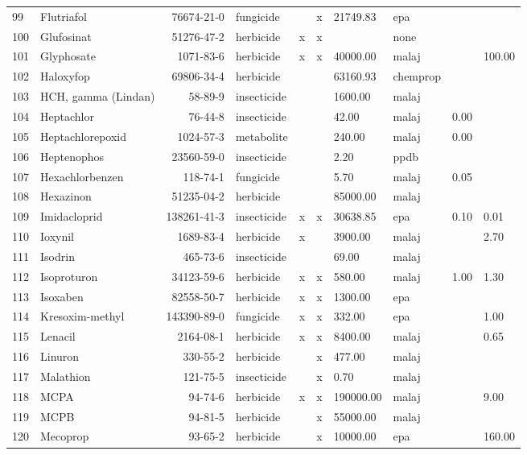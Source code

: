 \begin{longtable}{lp{3cm}rlp{0.5cm}p{0.5cm}p{1.5cm}p{1cm}p{1cm}p{1cm}}
  99 & Flutriafol & 76674-21-0 & fungicide &  & x & 21749.83 & epa &  &  \\ 
  100 & Glufosinat & 51276-47-2 & herbicide & x & x &  & none &  &  \\ 
  101 & Glyphosate & 1071-83-6 & herbicide & x & x & 40000.00 & malaj &  & 100.00 \\ 
  102 & Haloxyfop & 69806-34-4 & herbicide &  &  & 63160.93 & chemprop &  &  \\ 
  103 & HCH, gamma (Lindan) & 58-89-9 & insecticide &  &  & 1600.00 & malaj &  &  \\ 
  104 & Heptachlor & 76-44-8 & insecticide &  &  & 42.00 & malaj & 0.00 &  \\ 
  105 & Heptachlorepoxid & 1024-57-3 & metabolite &  &  & 240.00 & malaj & 0.00 &  \\ 
  106 & Heptenophos & 23560-59-0 & insecticide &  &  & 2.20 & ppdb &  &  \\ 
  107 & Hexachlorbenzen & 118-74-1 & fungicide &  &  & 5.70 & malaj & 0.05 &  \\ 
  108 & Hexazinon & 51235-04-2 & herbicide &  &  & 85000.00 & malaj &  &  \\ 
  109 & Imidacloprid & 138261-41-3 & insecticide & x & x & 30638.85 & epa & 0.10 & 0.01 \\ 
  110 & Ioxynil & 1689-83-4 & herbicide & x &  & 3900.00 & malaj &  & 2.70 \\ 
  111 & Isodrin & 465-73-6 & insecticide &  &  & 69.00 & malaj &  &  \\ 
  112 & Isoproturon & 34123-59-6 & herbicide & x & x & 580.00 & malaj & 1.00 & 1.30 \\ 
  113 & Isoxaben & 82558-50-7 & herbicide & x & x & 1300.00 & epa &  &  \\ 
  114 & Kresoxim-methyl & 143390-89-0 & fungicide & x & x & 332.00 & epa &  & 1.00 \\ 
  115 & Lenacil & 2164-08-1 & herbicide & x & x & 8400.00 & malaj &  & 0.65 \\ 
  116 & Linuron & 330-55-2 & herbicide &  & x & 477.00 & malaj &  &  \\ 
  117 & Malathion & 121-75-5 & insecticide &  & x & 0.70 & malaj &  &  \\ 
  118 & MCPA & 94-74-6 & herbicide & x & x & 190000.00 & malaj &  & 9.00 \\ 
  119 & MCPB & 94-81-5 & herbicide &  & x & 55000.00 & malaj &  &  \\ 
  120 & Mecoprop & 93-65-2 & herbicide &  & x & 10000.00 & epa &  & 160.00 \\ 

\end{longtable}
